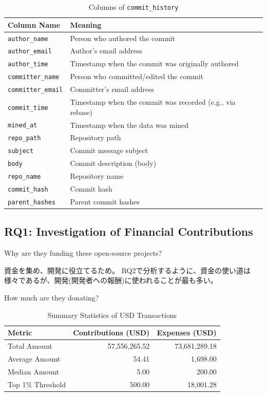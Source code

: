 \documentclass[11pt]{ist-thesis-lt}
\begin{document}
\begin{table}[htbp]
    \centering
    \caption{Columns of \texttt{commit\_history}}\label{tab:commit-history-columns}
    \begin{tabular}{ll}
        \toprule
        Column Name & Meaning \\
        \midrule
        \texttt{author\_name}    & Person who authored the commit \\
        \texttt{author\_email}   & Author's email address \\
        \texttt{author\_time}    & Timestamp when the commit was originally authored \\
        \texttt{committer\_name} & Person who committed/edited the commit \\
        \texttt{committer\_email}& Committer's email address \\
        \texttt{commit\_time}    & Timestamp when the commit was recorded (e.g., via rebase) \\
        \texttt{mined\_at}       & Timestamp when the data was mined \\
        \texttt{repo\_path}      & Repository path \\
        \texttt{subject}         & Commit message subject \\
        \texttt{body}            & Commit description (body) \\
        \texttt{repo\_name}      & Repository name \\
        \texttt{commit\_hash}    & Commit hash \\
        \texttt{parent\_hashes}  & Parent commit hashes \\
        \bottomrule
    \end{tabular}
\end{table}

\newpage
\subsection{RQ1: Investigation of Financial Contributions}

Why are they funding these open-source projects?

資金を集め、開発に役立てるため。
RQ2で分析するように、資金の使い道は様々であるが、開発(開発者への報酬)に使われることが最も多い。

How much are they donating?

\begin{table}[htbp]
\centering
\caption{Summary Statistics of USD Transactions}
\label{tab:transaction_summary}
\begin{tabular}{lrr}
\toprule
\textbf{Metric} & \textbf{Contributions (USD)} & \textbf{Expenses (USD)} \\
\midrule
Total Amount & 57,556,265.52 & 73,681,289.18 \\
Average Amount & 54.41 & 1,698.00 \\
Median Amount & 5.00 & 200.00 \\
Top 1\% Threshold & 500.00 & 18,001.28 \\
\bottomrule
\end{tabular}
\end{table}
\end{document}
